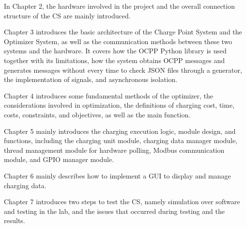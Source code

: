 \documentclass[
	english,
	ruledheaders=section,%
	class=report,%
	thesis={type=Report},%
	accentcolor=9c,%
	custommargins=true,%
	marginpar=false,%
	parskip=half-,%
	fontsize=11pt,%
	logofile={img/tuda_logo.pdf}, %
]{tudapub}
\begin{document}

In Chapter 2, the hardware involved in the project and the overall connection structure of the \ac{CS} are mainly introduced.


Chapter 3 introduces the basic architecture of the Charge Point System and the Optimizer System, as well as the communication methods between these two systems and the hardware. It covers how the \ac{OCPP} Python library is used together with its limitations, how the system obtains \ac{OCPP} messages and generates messages without every time to check JSON files through a generator, the implementation of signals, and asynchronous isolation.


Chapter 4 introduces some fundamental methods of the optimizer, the considerations involved in optimization, the definitions of charging cost, time, costs, constraints, and objectives, as well as the main function.



Chapter 5 mainly introduces the charging execution logic, module design, and functions, including the charging unit module, charging data manager module, thread management module for hardware polling, Modbus communication module, and GPIO manager module.


Chapter 6 mainly describes how to implement a \ac{GUI} to display and manage charging data.


Chapter 7 introduces two steps to test the \ac{CS}, namely simulation over software and testing in the lab, and the issues that occurred during testing and the results.
\end{document}
